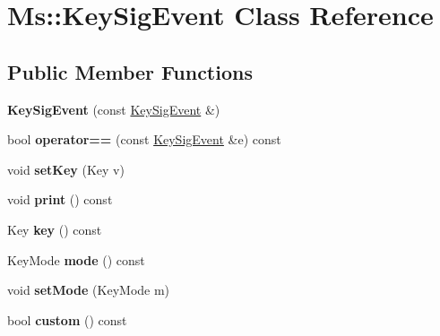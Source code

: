 \hypertarget{class_ms_1_1_key_sig_event}{}\section{Ms\+:\+:Key\+Sig\+Event Class Reference}
\label{class_ms_1_1_key_sig_event}
\subsection*{Public Member Functions}
\begin{DoxyCompactItemize}
\item 
\mbox{\label{class_ms_1_1_key_sig_event_a3ad993e09564785f5a8feae3d85d8dfc}} 
{\bfseries Key\+Sig\+Event} (const \hyperlink{class_ms_1_1_key_sig_event}{Key\+Sig\+Event} \&)
\item 
\mbox{\label{class_ms_1_1_key_sig_event_a55a72cd91a198d696cf4db35f6b89b9b}} 
bool {\bfseries operator==} (const \hyperlink{class_ms_1_1_key_sig_event}{Key\+Sig\+Event} \&e) const
\item 
\mbox{\label{class_ms_1_1_key_sig_event_a0e522f9b3f3cb460981a8c7826dc1a01}} 
void {\bfseries set\+Key} (Key v)
\item 
\mbox{\label{class_ms_1_1_key_sig_event_ad9aef94e4ced4932260087079958b15b}} 
void {\bfseries print} () const
\item 
\mbox{\label{class_ms_1_1_key_sig_event_acfd6238063aff81e1c432e35cda1a620}} 
Key {\bfseries key} () const
\item 
\mbox{\label{class_ms_1_1_key_sig_event_a932c48dc91278056122b8150e6b3b0bb}} 
Key\+Mode {\bfseries mode} () const
\item 
\mbox{\label{class_ms_1_1_key_sig_event_a3425822d08574041fb8a24fb93eddbe1}} 
void {\bfseries set\+Mode} (Key\+Mode m)
\item 
\mbox{\label{class_ms_1_1_key_sig_event_a315fdd9f8596374acf2b5a30675dbb9b}} 
bool {\bfseries custom} () const
\item 

\end{DoxyCompactItemize}
